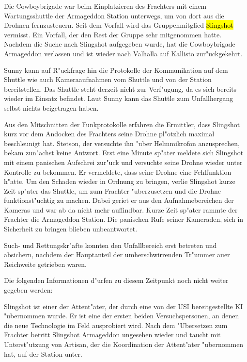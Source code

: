 Die Cowboybrigade war beim Einplatzieren des Frachters mit einem Wartungsshuttle der Armageddon Station unterwegs, um von dort aus die Drohnen fernzusteuern. Seit dem Vorfall wird das Gruppenmitglied \hl{Slingshot} vermisst. Ein Vorfall, der den Rest der Gruppe sehr mitgenommen hatte. Nachdem die Suche nach Slingshot aufgegeben wurde, hat die Cowboybrigade Armageddon verlassen und ist wieder nach Valhalla auf Kallisto zur"uckgekehrt.

Sunny kann auf R"uckfrage hin die Protokolle der Kommunikation auf dem Shuttle wie auch Kameraaufnahmen vom Shuttle und von der Station bereitstellen. Das Shuttle steht derzeit nicht zur Verf"ugung, da es sich bereits wieder im Einsatz befindet. Laut Sunny kann das Shuttle zum Unfallhergang selbst nichts beigetragen haben.

Aus den Mitschnitten der Funkprotokolle erfahren die Ermittler, dass Slingshot kurz vor dem Andocken des Frachters seine Drohne pl"otzlich maximal beschleunigt hat. Stetson, der versuchte ihn "uber Helmmikrofon anzusprechen, bekam zun"achst keine Antwort. Erst eine Minute sp"ater meldete sich Slingshot mit einem panischen Aufschrei zur"uck und versuchte seine Drohne wieder unter Kontrolle zu bekommen. Er vermeldete, dass seine Drohne eine Fehlfunktion h"atte. Um den Schaden wieder in Ordnung zu bringen, verlie\3 Slingshot kurze Zeit sp"ater das Shuttle, um zum Frachter "uberzusetzen und die Drohne funktionst"uchtig zu machen. Dabei geriet er aus den Aufnahmebereichen der Kameras und war ab da nicht mehr auffindbar. Kurze Zeit sp"ater rammte der Frachter die Armageddon Station. Die panischen Rufe seiner Kameraden, sich in Sicherheit zu bringen blieben unbeantwortet.

Such- und Rettungskr"afte konnten den Unfallbereich erst betreten und absichern, nachdem der Hauptanteil der umherschwirrenden Tr"ummer au\3er Reichweite getrieben waren.

\begin{remarks}
	Die folgenden Informationen d"urfen zu diesem Zeitpunkt noch nicht weiter gegeben werden:
	
	Slingshot ist einer der Attent"ater, der durch eine von der USI bereitgestellte KI "ubernommen wurde. Er ist eine der ersten beiden Versuchspersonen, an denen die neue Technologie im Feld ausprobiert wird. Nach dem "Ubersetzen zum Frachter betritt Slingshot Armageddon ungesehen wieder und taucht mit Unterst"utzung von Artisan, der die Koordination der Attent"ater "ubernommen hat, auf der Station unter.
\end{remarks}

